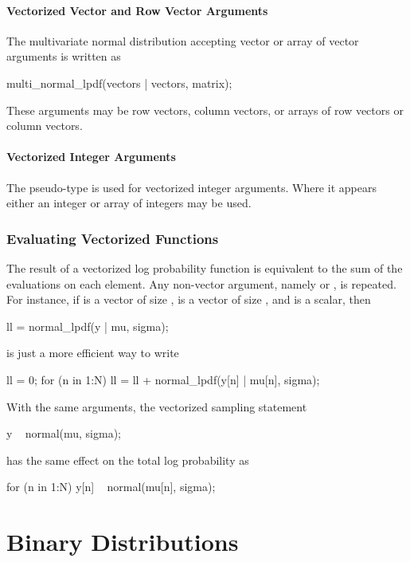 \subsubsection{Vectorized Vector and Row Vector Arguments}

The multivariate normal distribution accepting vector or array of
vector arguments is written as
%
\begin{stancode}
multi_normal_lpdf(vectors | vectors, matrix);
\end{stancode}
%
These arguments may be row vectors, column vectors, or arrays of row
vectors or column vectors.

\subsubsection{Vectorized Integer Arguments}

The pseudo-type  is used for vectorized integer arguments.
Where it appears either an integer or array of integers may be used.


\subsection{Evaluating Vectorized Functions}

The result of a vectorized log probability function is equivalent to
the sum of the evaluations on each element.  Any non-vector argument,
namely  or , is repeated.  For instance, if
 is a vector of size ,  is a vector of size
, and  is a scalar, then
%
\begin{stancode}
ll = normal_lpdf(y | mu, sigma);
\end{stancode}
%
is just a more efficient way to write
%
\begin{stancode}
ll = 0;
for (n in 1:N)
  ll = ll + normal_lpdf(y[n] | mu[n], sigma);
\end{stancode}
%
With the same arguments, the vectorized sampling statement
%
\begin{stancode}
y ~ normal(mu, sigma);
\end{stancode}
%
has the same effect on the total log probability as
%
\begin{stancode}
for (n in 1:N)
  y[n] ~ normal(mu[n], sigma);
\end{stancode}



\chapter{Binary Distributions}

